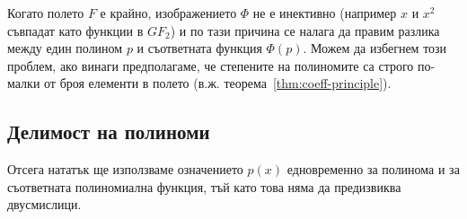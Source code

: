 \documentclass[numbers=endperiod, bibliography=totocnumbered]{scrartcl}
\begin{document}
Когато полето \( F \) е крайно, изображението \( \Phi \) не е инективно (например \( x \) и \( x^2 \) съвпадат като функции в \( GF_2 \)) и по тази причина се налага да правим разлика между един полином \( p \) и съответната функция \( \Phi(p) \). Можем да избегнем този проблем, ако винаги предполагаме, че степените на полиномите са строго по-малки от броя елементи в полето (в.ж. теорема~\ref{thm:coeff-principle}).

\subsection{Делимост на полиноми}

Отсега нататък ще използваме означението \( p(x) \) едновременно за полинома и за съответната полиномиална функция, тъй като това няма да предизвиква двусмислици.
\end{document}
